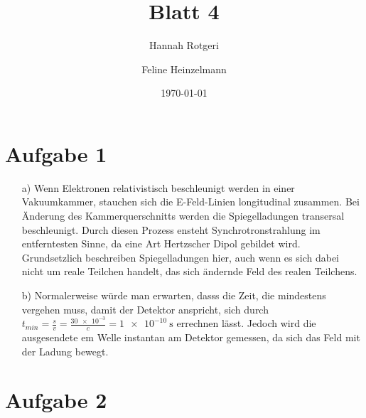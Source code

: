 \documentclass[11pt,a4paper]{article}
\title{Blatt 4}
\date{\today}
\author{Hannah Rotgeri \and Feline Heinzelmann}
\begin{document}
    \maketitle

    \section*{Aufgabe 1}
	\begin{itemize}
		\item[a)]
			Wenn Elektronen relativistisch beschleunigt werden in einer Vakuumkammer, stauchen sich die E-Feld-Linien longitudinal zusammen. 
			Bei Änderung des Kammerquerschnitts werden die Spiegelladungen transersal beschleunigt. Durch diesen Prozess ensteht Synchrotronstrahlung im entferntesten Sinne, da eine Art Hertzscher Dipol gebildet wird.
			Grundsetzlich beschreiben Spiegelladungen hier, auch wenn es sich dabei nicht um reale Teilchen handelt, das sich ändernde Feld des realen Teilchens.
		\item[b)]
			Normalerweise würde man erwarten, dasss die Zeit, die mindestens vergehen muss, damit der Detektor anspricht, sich durch
			$t_{min} = \frac{s}{v} = \frac{\num{30e-3}}{c} = \SI{1e-10}{\second}$ errechnen lässt. Jedoch wird die ausgesendete em Welle instantan am Detektor 
			gemessen, da sich das Feld mit der Ladung bewegt.
	\end{itemize}


	
    \section*{Aufgabe 2}
\end{document}
